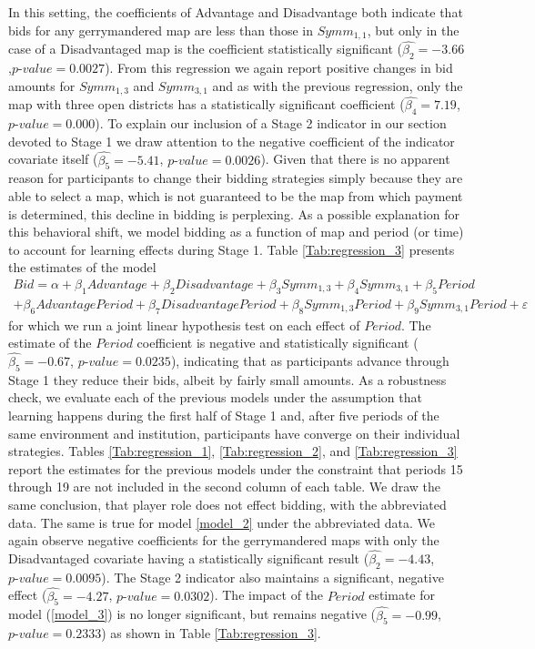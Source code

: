\documentclass[AER]{AEA}
\begin{document}
In this setting, the coefficients of Advantage and Disadvantage both indicate that bids for any gerrymandered map are less than those in $Symm_{1,1}$, but only in the case of a Disadvantaged map is the coefficient statistically significant ($\hat{\beta_2} = -3.66$,$\mathit{p\mbox{-}value} = 0.0027$). From this regression we again report positive changes in bid amounts for $Symm_{1,3}$ and $Symm_{3,1}$ and as with the previous regression, only the map with three open districts has a statistically significant coefficient ($\hat{\beta_4} = 7.19$, $\mathit{p\mbox{-}value} = 0.000$). To explain our inclusion of a Stage 2 indicator in our section devoted to Stage 1 we draw attention to the negative coefficient of the indicator covariate itself ($\hat{\beta_5} = -5.41$, $\mathit{p\mbox{-}value} = 0.0026$). Given that there is no apparent reason for participants to change their bidding strategies simply because they are able to select a map, which is not guaranteed to be the map from which payment is determined, this decline in bidding is perplexing. As a possible explanation for this behavioral shift, we model bidding as a function of map and period (or time) to account for learning effects during Stage 1. Table \ref{Tab:regression_3} presents the estimates of the model
\begin{multline}\label{model_3}
Bid = \alpha + \beta_1 Advantage + \beta_2 Disadvantage + \beta_3 Symm_{1,3} + \beta_4 Symm_{3,1} + \beta_5 Period
 \\ + \beta_6 Advantage Period + \beta_7 Disadvantage Period + \beta_8 Symm_{1,3} Period + \beta_9 Symm_{3,1}Period + \varepsilon
\end{multline}
for which we run a joint linear hypothesis test on each effect of $Period$. The estimate of the $Period$ coefficient is negative and statistically significant ($\hat{\beta_5} = -0.67$, $\mathit{p\mbox{-}value} = 0.0235$), indicating that as participants advance through Stage 1 they reduce their bids, albeit by fairly small amounts. As a robustness check, we evaluate each of the previous models under the assumption that learning happens during the first half of Stage 1 and, after five periods of the same environment and institution, participants have converge on their individual strategies. Tables \ref{Tab:regression_1}, \ref{Tab:regression_2}, and \ref{Tab:regression_3} report the estimates for the previous models under the constraint that periods 15 through 19 are not included in the second column of each table. We draw the same conclusion, that player role does not effect bidding, with the abbreviated data. The same is true for model \ref{model_2} under the abbreviated data. We again observe negative coefficients for the gerrymandered maps with only the Disadvantaged covariate having a statistically significant result ($\hat{\beta_2} = -4.43$,$\mathit{p\mbox{-}value} = 0.0095$). The Stage 2 indicator also maintains a significant, negative effect ($\hat{\beta_5} = -4.27$, $\mathit{p\mbox{-}value} = 0.0302$). The impact of the $Period$ estimate for model (\ref{model_3}) is no longer significant, but remains negative ($\hat{\beta_5} = -0.99$, $\mathit{p\mbox{-}value} = 0.2333$) as shown in Table \ref{Tab:regression_3}.
\end{document}
